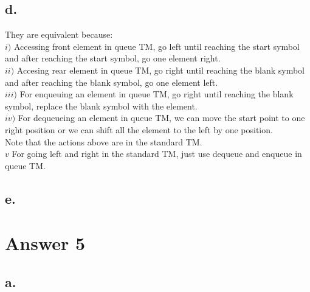 \documentclass[12pt]{article}
\begin{document}
\subsection*{d.}
They are equivalent because:\\
$i)$ Accessing front element in queue TM, go left until reaching the start symbol and after reaching the start symbol, go one element right.\\
$ii)$ Accesing rear element in queue TM, go right until reaching the blank symbol and after reaching the blank symbol, go one element left.\\
$iii)$ For enqueuing an element in queue TM, go right until reaching the blank symbol, replace the blank symbol with the element.\\
$iv)$ For dequeueing an element in queue TM, we can move the start point to one right position or we can shift all the element to the left by one position.\\
Note that the actions above are in the standard TM.\\
$v$ For going left and right in the standard TM, just use dequeue and enqueue in queue TM.\\

\subsection*{e.}

\section*{Answer 5}

\subsection*{a.}
\end{document}
